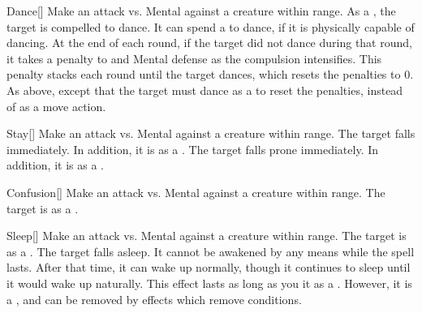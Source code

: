 \lowercase{\hypertarget{spell:Dance}{}}\label{spell:Dance}
\begin{freeability}[\nth{1}]{\hypertarget{spell:Dance}{Dance}}[]
Make an attack vs. Mental against a creature within \rngmed range.
\hit As a , the target is compelled to dance.
It can spend a  to dance, if it is physically capable of dancing.
At the end of each round, if the target did not dance during that round, it takes a  penalty to  and Mental defense as the compulsion intensifies.
This penalty stacks each round until the target dances, which resets the penalties to 0.
\crit As above, except that the target must dance as a  to reset the penalties, instead of as a move action.
\end{freeability}
\vspace{0.25em}



\lowercase{\hypertarget{spell:Stay}{}}\label{spell:Stay}
\begin{freeability}[\nth{1}]{\hypertarget{spell:Stay}{Stay}}[]
Make an attack vs. Mental against a creature within \rngmed range.
\hit The target falls  immediately. In addition, it is  as a .
\crit The target falls prone immediately. In addition, it is  as a .
\end{freeability}
\vspace{0.25em}



\lowercase{\hypertarget{spell:Confusion}{}}\label{spell:Confusion}
\begin{freeability}[\nth{3}]{\hypertarget{spell:Confusion}{Confusion}}[]
Make an attack vs. Mental against a creature within \rngmed range.
\hit The target is \confused as a .
\end{freeability}
\vspace{0.25em}



\lowercase{\hypertarget{spell:Sleep}{}}\label{spell:Sleep}
\begin{freeability}[\nth{3}]{\hypertarget{spell:Sleep}{Sleep}}[]
Make an attack vs. Mental against a creature within \rngclose range.
\hit The target is \blinded as a .
\crit The target falls asleep.
It cannot be awakened by any means while the spell lasts.
After that time, it can wake up normally, though it continues to sleep until it would wake up naturally.
This effect lasts as long as you  it as a .
However, it is a , and can be removed by effects which remove conditions.
\end{freeability}
\vspace{0.25em}



